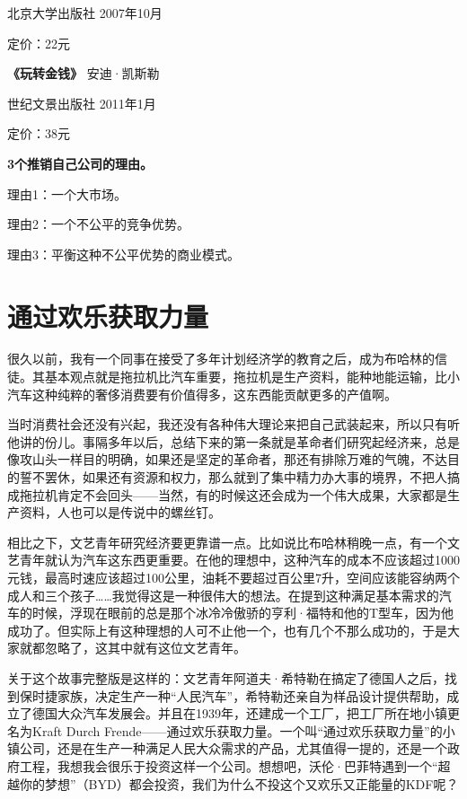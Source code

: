 北京大学出版社 2007年10月

定价：22元

\textbf{《玩转金钱》} 安迪·凯斯勒

世纪文景出版社 2011年1月

定价：38元

\textbf{3个推销自己公司的理由。}

理由1：一个大市场。

理由2：一个不公平的竞争优势。

理由3：平衡这种不公平优势的商业模式。

\hypertarget{ux901aux8fc7ux6b22ux4e50ux83b7ux53d6ux529bux91cf}{%
\section{通过欢乐获取力量}\label{ux901aux8fc7ux6b22ux4e50ux83b7ux53d6ux529bux91cf}}

很久以前，我有一个同事在接受了多年计划经济学的教育之后，成为布哈林的信徒。其基本观点就是拖拉机比汽车重要，拖拉机是生产资料，能种地能运输，比小汽车这种纯粹的奢侈消费要有价值得多，这东西能贡献更多的产值啊。

当时消费社会还没有兴起，我还没有各种伟大理论来把自己武装起来，所以只有听他讲的份儿。事隔多年以后，总结下来的第一条就是革命者们研究起经济来，总是像攻山头一样目的明确，如果还是坚定的革命者，那还有排除万难的气魄，不达目的誓不罢休，如果还有资源和权力，那么就到了集中精力办大事的境界，不把人搞成拖拉机肯定不会回头------当然，有的时候这还会成为一个伟大成果，大家都是生产资料，人也可以是传说中的螺丝钉。

相比之下，文艺青年研究经济要更靠谱一点。比如说比布哈林稍晚一点，有一个文艺青年就认为汽车这东西更重要。在他的理想中，这种汽车的成本不应该超过1000元钱，最高时速应该超过100公里，油耗不要超过百公里7升，空间应该能容纳两个成人和三个孩子\ldots\ldots 我觉得这是一种很伟大的想法。在提到这种满足基本需求的汽车的时候，浮现在眼前的总是那个冰冷冷傲骄的亨利·福特和他的T型车，因为他成功了。但实际上有这种理想的人可不止他一个，也有几个不那么成功的，于是大家就都忽略了，这其中就有这位文艺青年。

关于这个故事完整版是这样的：文艺青年阿道夫·希特勒在搞定了德国人之后，找到保时捷家族，决定生产一种``人民汽车''，希特勒还亲自为样品设计提供帮助，成立了德国大众汽车发展会。并且在1939年，还建成一个工厂，把工厂所在地小镇更名为Kraft
Durch
Frende------通过欢乐获取力量。一个叫``通过欢乐获取力量''的小镇公司，还是在生产一种满足人民大众需求的产品，尤其值得一提的，还是一个政府工程，我想我会很乐于投资这样一个公司。想想吧，沃伦·巴菲特遇到一个``超越你的梦想''（BYD）都会投资，我们为什么不投这个又欢乐又正能量的KDF呢？

